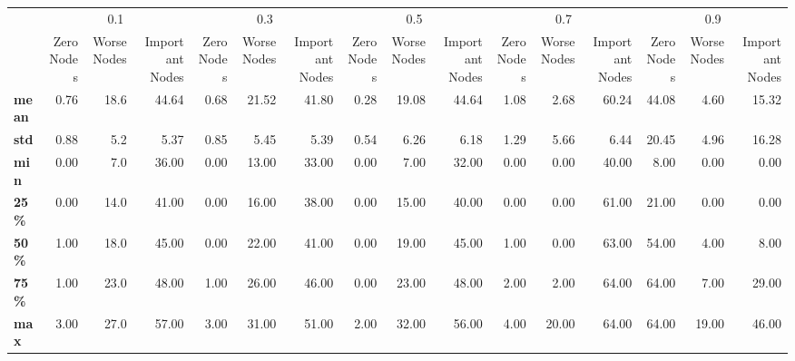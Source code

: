 \begin{tabular}{lrrrrrrrrrrrrrrr}
\toprule
{} & \multicolumn{3}{c}{0.1} & \multicolumn{3}{c}{0.3} & \multicolumn{3}{c}{0.5} & \multicolumn{3}{c}{0.7} & \multicolumn{3}{c}{0.9} \\
{} & Zero Nodes & Worse Nodes & Important Nodes & Zero Nodes & Worse Nodes & Important Nodes & Zero Nodes & Worse Nodes & Important Nodes & Zero Nodes & Worse Nodes & Important Nodes & Zero Nodes & Worse Nodes & Important Nodes \\
\midrule
\textbf{mean} &       0.76 &        18.6 &           44.64 &       0.68 &       21.52 &           41.80 &       0.28 &       19.08 &           44.64 &       1.08 &        2.68 &           60.24 &      44.08 &        4.60 &           15.32 \\
\textbf{std } &       0.88 &         5.2 &            5.37 &       0.85 &        5.45 &            5.39 &       0.54 &        6.26 &            6.18 &       1.29 &        5.66 &            6.44 &      20.45 &        4.96 &           16.28 \\
\textbf{min } &       0.00 &         7.0 &           36.00 &       0.00 &       13.00 &           33.00 &       0.00 &        7.00 &           32.00 &       0.00 &        0.00 &           40.00 &       8.00 &        0.00 &            0.00 \\
\textbf{25\% } &       0.00 &        14.0 &           41.00 &       0.00 &       16.00 &           38.00 &       0.00 &       15.00 &           40.00 &       0.00 &        0.00 &           61.00 &      21.00 &        0.00 &            0.00 \\
\textbf{50\% } &       1.00 &        18.0 &           45.00 &       0.00 &       22.00 &           41.00 &       0.00 &       19.00 &           45.00 &       1.00 &        0.00 &           63.00 &      54.00 &        4.00 &            8.00 \\
\textbf{75\% } &       1.00 &        23.0 &           48.00 &       1.00 &       26.00 &           46.00 &       0.00 &       23.00 &           48.00 &       2.00 &        2.00 &           64.00 &      64.00 &        7.00 &           29.00 \\
\textbf{max } &       3.00 &        27.0 &           57.00 &       3.00 &       31.00 &           51.00 &       2.00 &       32.00 &           56.00 &       4.00 &       20.00 &           64.00 &      64.00 &       19.00 &           46.00 \\
\bottomrule
\end{tabular}
